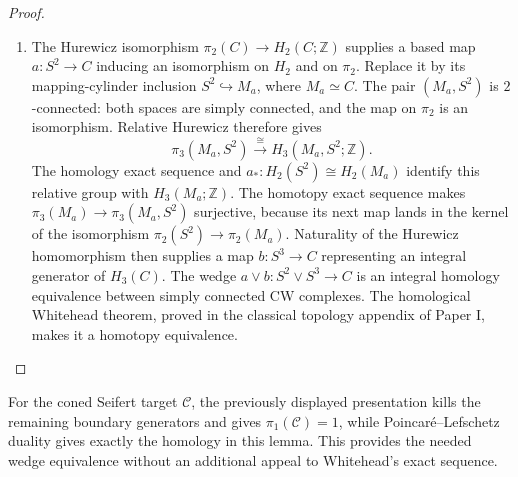 \begin{proof}
\begin{enumerate}[label=\arabic*.,leftmargin=*]
\item The Hurewicz isomorphism $\pi_2(C)\to H_2(C;\mathbb Z)$ supplies a
based map $a:S^2\to C$ inducing an isomorphism on $H_2$ and on
$\pi_2$. Replace it by its mapping-cylinder inclusion
$S^2\hookrightarrow M_a$, where $M_a\simeq C$.
The pair $(M_a,S^2)$ is $2$-connected: both spaces are simply
connected, and the map on $\pi_2$ is an isomorphism.
Relative Hurewicz therefore gives
\[
 \pi_3(M_a,S^2)\xrightarrow{\ \cong\ }
 H_3(M_a,S^2;\mathbb Z).
\]
The homology exact sequence and $a_*:H_2(S^2)\cong H_2(M_a)$
identify this relative group with $H_3(M_a;\mathbb Z)$.
The homotopy exact sequence makes
$\pi_3(M_a)\to\pi_3(M_a,S^2)$ surjective, because its next map
lands in the kernel of the isomorphism
$\pi_2(S^2)\to\pi_2(M_a)$.
Naturality of the Hurewicz homomorphism then supplies a map
$b:S^3\to C$ representing an integral generator of $H_3(C)$.
The wedge $a\vee b:S^2\vee S^3\to C$ is an integral homology
equivalence between simply connected CW complexes. The homological
Whitehead theorem, proved in the classical topology appendix of Paper I,
makes it a homotopy equivalence.
\end{enumerate}
\end{proof}

For the coned Seifert target $\mathcal C$, the previously displayed
presentation kills the remaining boundary generators and gives
$\pi_1(\mathcal C)=1$, while Poincaré--Lefschetz duality gives exactly
the homology in this lemma. This provides the needed wedge equivalence
without an additional appeal to Whitehead's exact sequence.



